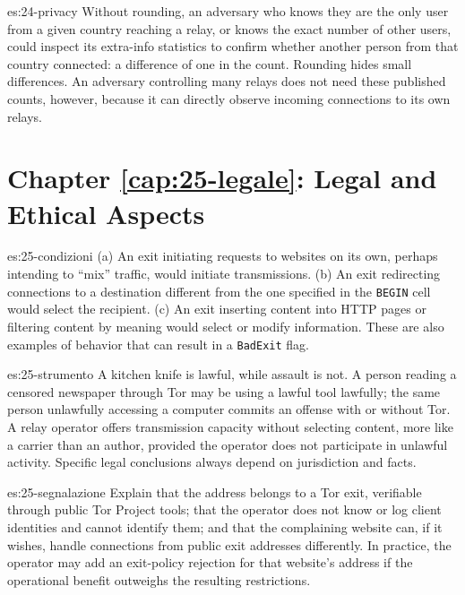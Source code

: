 \begin{soluzione}{es:24-privacy}
Without rounding, an adversary who knows they are the only user from a given country reaching a relay, or knows the exact number of other users, could inspect its extra-info statistics to confirm whether another person from that country connected: a difference of one in the count. Rounding hides small differences. An adversary controlling many relays does not need these published counts, however, because it can directly observe incoming connections to its own relays.
\end{soluzione}

\section*{Chapter \ref{cap:25-legale}: Legal and Ethical Aspects}

\begin{soluzione}{es:25-condizioni}
(a) An exit initiating requests to websites on its own, perhaps intending to \enquote{mix} traffic, would initiate transmissions. (b) An exit redirecting connections to a destination different from the one specified in the \texttt{BEGIN} cell would select the recipient. (c) An exit inserting content into HTTP pages or filtering content by meaning would select or modify information. These are also examples of behavior that can result in a \texttt{BadExit} flag.
\end{soluzione}

\begin{soluzione}{es:25-strumento}
A kitchen knife is lawful, while assault is not. A person reading a censored newspaper through Tor may be using a lawful tool lawfully; the same person unlawfully accessing a computer commits an offense with or without Tor. A relay operator offers transmission capacity without selecting content, more like a carrier than an author, provided the operator does not participate in unlawful activity. Specific legal conclusions always depend on jurisdiction and facts.
\end{soluzione}

\begin{soluzione}{es:25-segnalazione}
Explain that the address belongs to a Tor exit, verifiable through public Tor Project tools; that the operator does not know or log client identities and cannot identify them; and that the complaining website can, if it wishes, handle connections from public exit addresses differently. In practice, the operator may add an exit-policy rejection for that website's address if the operational benefit outweighs the resulting restrictions.
\end{soluzione}

